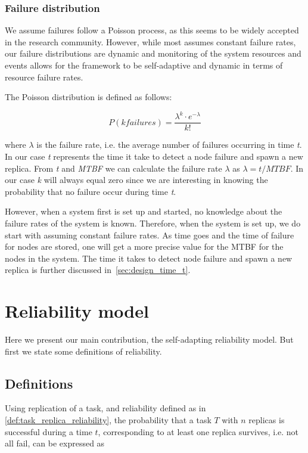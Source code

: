 \documentclass{cslthse-msc}
\begin{document}
\subsubsection{Failure distribution}
We assume failures follow a Poisson process, as this seems to be widely accepted in the research community. However, while most assumes constant failure rates, our failure distributions are dynamic and monitoring of the system resources and events allows for the framework to be self-adaptive and dynamic in terms of resource failure rates.

The Poisson distribution is defined as follows:

\begin{equation} \label{eq:Poisson}
P(k failures) = \dfrac{\lambda^k \cdot e^{-\lambda}}{k!}
\end{equation}

where $\lambda$ is the failure rate, i.e. the average number of failures occurring in time \emph{t}. In our case \emph{t} represents the time it take to detect a node failure and spawn a new replica. From \emph{t} and \emph{MTBF} we can calculate the failure rate $\lambda$ as $\lambda = t/MTBF$. In our case \emph{k} will always equal zero since we are interesting in knowing the probability that no failure occur during time \emph{t}. 

However, when a system first is set up and started, no knowledge about the failure rates of the system is known. Therefore, when the system is set up, we do start with assuming constant failure rates. As time goes and the time of failure for nodes are stored, one will get a more precise value for the MTBF for the nodes in the system. The time it takes to detect node failure and spawn a new replica is further discussed in~\cref{sec:design_time_t}.

\section{Reliability model} \label{sec:design_reliability_model}
Here we present our main contribution, the self-adapting reliability model. But first we state some definitions of reliability.

\subsection{Definitions} \label{subsec:design_definitions}
Using replication of a task, and reliability defined as in \cref{def:task_replica_reliability}, the probability that a task $T$ with $n$ replicas is successful during a time $t$, corresponding to at least one replica survives, i.e. not all fail, can be expressed as 
\end{document}

